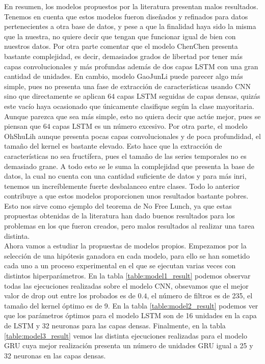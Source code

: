    En resumen, los modelos propuestos por la literatura presentan malos resultados. Tenemos en cuenta que estos modelos fueron diseñados y refinados para datos pertenecientes a otra base de datos, y pese a que la finalidad haya sido la misma que la nuestra, no quiere decir que tengan que funcionar igual de bien con nuestros datos. Por otra parte comentar que el modelo ChenChen presenta bastante complejidad, es decir, demasiados grados de libertad por tener más capas convolucionales y más profundas además de dos capas LSTM con una gran cantidad de unidades. En cambio, modelo GaoJunLi puede parecer algo más simple, pues no presenta una fase de extracción de características usando CNN sino que directamente se aplican $64$ capas LSTM seguidas de capas densas, quizás este vacío haya ocasionado que únicamente clasifique según la clase mayoritaria. Aunque parezca que sea más simple, esto no quiera decir que actúe mejor, pues se piensan que $64$ capas LSTM es un número excesivo. Por otra parte, el modelo OhShuLih aunque presenta pocas capas convolucionales y de poca profundidad, el tamaño del kernel es bastante elevado. Esto hace que la extracción de características no sea fructífera, pues el tamaño de las series temporales no es demasiado grane. A todo esto se le suma la complejidad que presenta la base de datos, la cual no cuenta con una cantidad suficiente de datos y para más inri, tenemos un increíblemente fuerte desbalanceo entre clases. Todo lo anterior contribuye a que estos modelos proporcionen unos resultados bastante pobres. Esto nos sirve como ejemplo del teorema de No Free Lunch, ya que estas propuestas obtenidas de la literatura han dado buenos resultados para los problemas en los que fueron creados, pero malos resultados al realizar una tarea distinta. \\
    
    Ahora vamos a estudiar la propuestas de modelos propios. Empezamos por la selección de una hipótesis ganadora en cada modelo, para ello se han sometido cada uno a un proceso experimental en el que se ejecutan varias veces con distintos hiperparámetros. En la tabla \ref{table:model1_result} podemos observar todas las ejecuciones realizadas sobre el modelo CNN, obsevamos que el mejor valor de drop out entre los probados es de $0.4$, el número de filtros es de 235, el tamaño del kernel óptimo es de 9. En la tabla \ref{table:model2_result} podemos ver que los parámetros óptimos para el modelo LSTM son de 16 unidades en la capa de LSTM y 32 neuronas para las capas densas. Finalmente, en la tabla \ref{table:model3_result} vemos las distinta ejecuciones realizadas para el modelo GRU cuya mejor realización presenta un número de unidades GRU igual a 25 y 32 neuronas en las capas densas. \\
    
